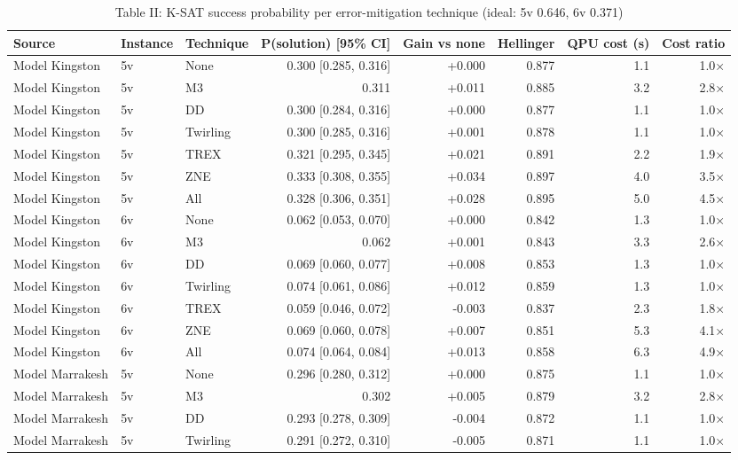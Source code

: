 \begin{table}[t]
\centering
\small
\caption{Table II: K-SAT success probability per error-mitigation technique (ideal: 5v 0.646, 6v 0.371)}
\label{tab:II}
\begin{tabular}{lllrrrrr}
\toprule
Source & Instance & Technique & P(solution) [95\% CI] & Gain vs none & Hellinger & QPU cost (s) & Cost ratio \\
\midrule
Model Kingston & 5v & None & 0.300 [0.285, 0.316] & +0.000 & 0.877 & 1.1 & 1.0× \\
Model Kingston & 5v & M3 & 0.311 & +0.011 & 0.885 & 3.2 & 2.8× \\
Model Kingston & 5v & DD & 0.300 [0.284, 0.316] & +0.000 & 0.877 & 1.1 & 1.0× \\
Model Kingston & 5v & Twirling & 0.300 [0.285, 0.316] & +0.001 & 0.878 & 1.1 & 1.0× \\
Model Kingston & 5v & TREX & 0.321 [0.295, 0.345] & +0.021 & 0.891 & 2.2 & 1.9× \\
Model Kingston & 5v & ZNE & 0.333 [0.308, 0.355] & +0.034 & 0.897 & 4.0 & 3.5× \\
Model Kingston & 5v & All & 0.328 [0.306, 0.351] & +0.028 & 0.895 & 5.0 & 4.5× \\
Model Kingston & 6v & None & 0.062 [0.053, 0.070] & +0.000 & 0.842 & 1.3 & 1.0× \\
Model Kingston & 6v & M3 & 0.062 & +0.001 & 0.843 & 3.3 & 2.6× \\
Model Kingston & 6v & DD & 0.069 [0.060, 0.077] & +0.008 & 0.853 & 1.3 & 1.0× \\
Model Kingston & 6v & Twirling & 0.074 [0.061, 0.086] & +0.012 & 0.859 & 1.3 & 1.0× \\
Model Kingston & 6v & TREX & 0.059 [0.046, 0.072] & -0.003 & 0.837 & 2.3 & 1.8× \\
Model Kingston & 6v & ZNE & 0.069 [0.060, 0.078] & +0.007 & 0.851 & 5.3 & 4.1× \\
Model Kingston & 6v & All & 0.074 [0.064, 0.084] & +0.013 & 0.858 & 6.3 & 4.9× \\
Model Marrakesh & 5v & None & 0.296 [0.280, 0.312] & +0.000 & 0.875 & 1.1 & 1.0× \\
Model Marrakesh & 5v & M3 & 0.302 & +0.005 & 0.879 & 3.2 & 2.8× \\
Model Marrakesh & 5v & DD & 0.293 [0.278, 0.309] & -0.004 & 0.872 & 1.1 & 1.0× \\
Model Marrakesh & 5v & Twirling & 0.291 [0.272, 0.310] & -0.005 & 0.871 & 1.1 & 1.0× \\

\end{tabular}
\end{table}
